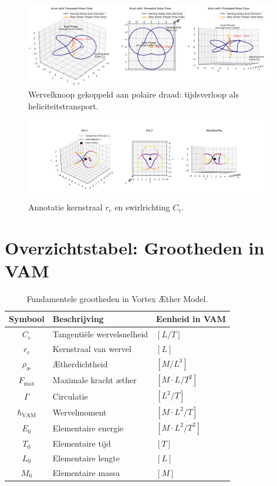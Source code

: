 \documentclass{article}
\begin{document}
    \begin{figure}[h!]
        \centering
        \includegraphics[width=0.98\textwidth]{KnotThreadedPolarFlow.png}
        \caption{Wervelknoop gekoppeld aan polaire draad: tijdsverloop als heliciteitstransport.}
    \end{figure}

    \begin{figure}[h!]
        \centering
        \includegraphics[width=0.95\textwidth]{vortex_knot_diagram.png}
        \caption{Annotatie kernstraal $r_c$ en swirlrichting $C_e$.}
    \end{figure}

    \section{Overzichtstabel: Grootheden in VAM}
    \begin{table}[h!]
        \centering
        \begin{tabular}{|c|l|l|}
            \hline
            \textbf{Symbool} & \textbf{Beschrijving} & \textbf{Eenheid in VAM} \\
            \hline
            $C_e$ & Tangentiële wervelsnelheid & $[L/T]$ \\
            $r_c$ & Kernstraal van wervel & $[L]$ \\
            $\rho_\text{\ae}$ & Ætherdichtheid & $[M/L^3]$ \\
            $F_\text{max}$ & Maximale kracht æther & $[M \cdot L/T^2]$ \\
            $\Gamma$ & Circulatie & $[L^2/T]$ \\
            $\hbar_\text{VAM}$ & Wervelmoment & $[M \cdot L^2 / T]$ \\
            $E_0$ & Elementaire energie & $[M \cdot L^2 / T^2]$ \\
            $T_0$ & Elementaire tijd & $[T]$ \\
            $L_0$ & Elementaire lengte & $[L]$ \\
            $M_0$ & Elementaire massa & $[M]$ \\
            \hline
        \end{tabular}
        \caption{Fundamentele grootheden in Vortex Æther Model.}
    \end{table}


    
    
    
    
    
    

    
    \printbibliography
\end{document}
